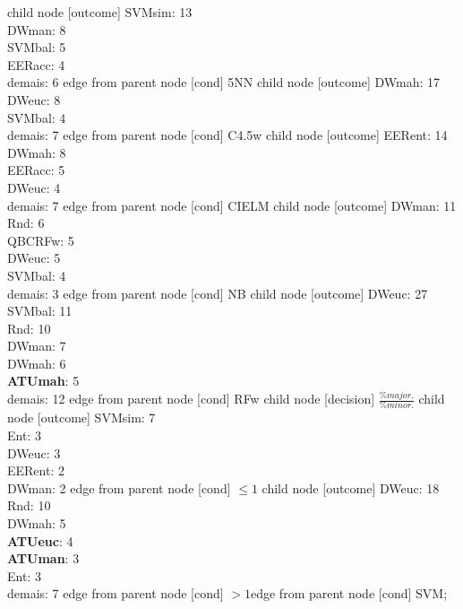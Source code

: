 child {node [outcome] {SVMsim: 13\\
DWman: 8\\
SVMbal: 5\\
EERacc: 4\\
demais: 6} edge from parent node [cond] {5NN}}
child {node [outcome] {DWmah: 17\\
DWeuc: 8\\
SVMbal: 4\\
demais: 7} edge from parent node [cond] {C4.5w}}
child {node [outcome] {EERent: 14\\
DWmah: 8\\
EERacc: 5\\
DWeuc: 4\\
demais: 7} edge from parent node [cond] {CIELM}}
child {node [outcome] {DWman: 11\\
Rnd: 6\\
QBCRFw: 5\\
DWeuc: 5\\
SVMbal: 4\\
demais: 3} edge from parent node [cond] {NB}}
child {node [outcome] {DWeuc: 27\\
SVMbal: 11\\
Rnd: 10\\
DWman: 7\\
DWmah: 6\\
\textbf{ATUmah}: 5\\
demais: 12} edge from parent node [cond] {RFw}}
child {node [decision] {$\frac{\%major.}{\%minor.}$}
child {node [outcome] {SVMsim: 7\\
Ent: 3\\
DWeuc: 3\\
EERent: 2\\
DWman: 2} edge from parent node [cond] {$\leq1$}}
child {node [outcome] {DWeuc: 18\\
Rnd: 10\\
DWmah: 5\\
\textbf{ATUeuc}: 4\\
\textbf{ATUman}: 3\\
Ent: 3\\
demais: 7} edge from parent node [cond] {$>1$}}edge from parent node [cond] {SVM}};